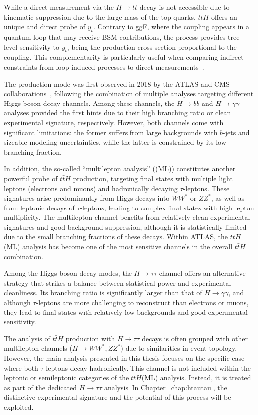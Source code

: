 While a direct measurement via the $H\to t\bar{t}$ decay is not accessible due to kinematic suppression due to the large mass of the top quarks, $t\bar{t}H$ offers an unique and direct probe of $y_t$. Contrary to ggF, where the coupling appears in a quantum loop that may receive BSM contributions, the \ttH process provides tree-level sensitivity to $y_t$, being the production cross-section proportional to the coupling. This complementarity is particularly useful when comparing indirect constraints from loop-induced processes to direct measurements~\cite{Ng:1983jm,Kunszt:1984ri,Beenakker:2001rj}.

The \ttH production mode was first observed in 2018 by the ATLAS and CMS collaborations~\cite{ATLAS:2018mme,CMS:2018uxb}, following the combination of multiple analyses targeting different Higgs boson decay channels. Among these channels, the $H\to b \bar{b}$ and $H\to \gamma \gamma$ analyses provided the first hints due to their high branching ratio or clean experimental signature, respectively. However, both channels come with significant limitations: the former suffers from large backgrounds with $b$-jets and sizeable modeling uncertainties, while the latter is constrained by its low branching fraction.

In addition, the so-called ``multilepton analysis'' (\ttH(ML)) constitutes another powerful probe of $t\bar{t}H$ production, targeting final states with multiple light leptons (electrons and muons) and hadronically decaying $\tau$-leptons. These signatures arise predominantly from Higgs decays into $WW^*$ or $ZZ^*$, as well as from leptonic decays of $\tau$-leptons, leading to complex final states with high lepton multiplicity. The multilepton channel benefits from relatively clean experimental signatures and good background suppression, although it is statistically limited due to the small branching fractions of these decays. Within ATLAS, the $t\bar{t}H$(ML) analysis has become one of the most sensitive channels in the overall $t\bar{t}H$ combination.

Among the Higgs boson decay modes, the $H\to\tau\tau$ channel offers an alternative strategy that strikes a balance between statistical power and experimental cleanliness. Its branching ratio is significantly larger than that of $H\to \gamma \gamma$, and although $\tau$-leptons are more challenging to reconstruct than electrons or muons, they lead to final states with relatively low backgrounds and good experimental sensitivity.

The analysis of $t\bar{t}H$ production with $H\to\tau\tau$ decays is often grouped with other multilepton channels ($H\to WW^*, ZZ^*$) due to similarities in event topology. However, the main analysis presented in this thesis focuses on the specific case where both $\tau$-leptons decay hadronically. This channel is not included within the leptonic or semileptonic categories of the $t\bar{t}H$(ML) analysis. Instead, it is treated as part of the dedicated $H\to\tau\tau$ analysis. In Chapter~\ref{chap:htautau}, the distinctive experimental signature and the potential of this process will be exploited.
